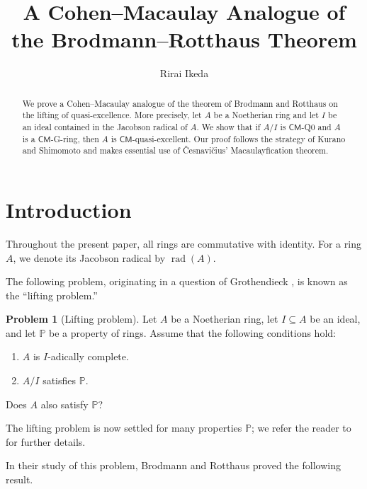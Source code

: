 \documentclass[a4paper, 11pt]{amsart}
\title[A CM Analogue of the Brodmann--Rotthaus Theorem]{A Cohen--Macaulay Analogue of the Brodmann--Rotthaus Theorem}
\author{Rirai Ikeda}
\theoremstyle{definition}
\newtheorem{problem}[theorem]{Problem}
\newcommand{\PP}{\mathbb{P}}
\newcommand{\rad}{\operatorname{rad}}
\let\subset\subseteq
\begin{document}
\begin{abstract}
    We prove a Cohen--Macaulay analogue of the theorem of Brodmann and Rotthaus on the lifting of quasi-excellence. More precisely, let $A$ be a Noetherian ring and let $I$ be an ideal contained in the Jacobson radical of $A$. We show that if $A/I$ is $\mathsf{CM}$-Q0 and $A$ is a $\mathsf{CM}$\textnormal{-G-}ring, then $A$ is $\mathsf{CM}$-quasi-excellent. Our proof follows the strategy of Kurano and Shimomoto and makes essential use of \v{C}esnavi\v{c}ius' Macaulayfication theorem.
\end{abstract}

\maketitle

\tableofcontents

\section{Introduction}\label{sec:introduction}

Throughout the present paper, all rings are commutative with identity. For a ring $A$, we denote its Jacobson radical by $\rad(A)$.

The following problem, originating in a question of Grothendieck \cite[({\textbf{IV}},~7.4.8)]{Gro65}, is known as the ``lifting problem.''

\begin{problem}[Lifting problem]\label{prob:lifting}
    Let $A$ be a Noetherian ring, let $I \subset A$ be an ideal, and let $\PP$ be a property of rings. Assume that the following conditions hold:
    \begin{enumerate}
        \item $A$ is $I$-adically complete.
        \item $A/I$ satisfies $\PP$.
    \end{enumerate}
    Does $A$ also satisfy $\PP$?
\end{problem}

The lifting problem is now settled for many properties $\PP$; we refer the reader to \cite{KS21,Lyu25,Lyu26} for further details. 

In their study of this problem, Brodmann and Rotthaus proved the following result. 
\end{document}
